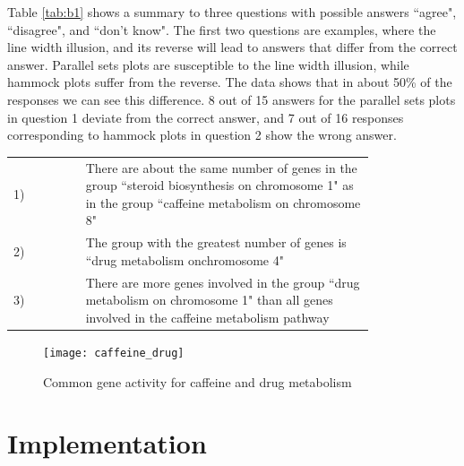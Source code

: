 Table \ref{tab:b1} shows a summary to three questions with possible answers ``agree", ``disagree", and ``don't know".
The first two questions are  examples, where the line width illusion, and its reverse will lead to answers that differ from the correct answer. Parallel sets plots are susceptible to the line width illusion, while hammock plots suffer from the reverse. The data shows that in about 50\% of the responses we can see this difference. 8 out of 15 answers for the parallel sets plots in question 1 deviate from the correct answer, and 7 out of 16 responses corresponding to hammock plots in question 2 show the wrong answer.


\begin{tabular}{lp{0.8\linewidth}}
 1) & There are about the same number of genes in the group ``steroid biosynthesis on chromosome 1" as in the group ``caffeine metabolism on chromosome 8"\\
 2) & The group with the greatest number of genes is ``drug metabolism onchromosome 4"\\
 3) & There are more genes involved in the group ``drug metabolism on chromosome 1" than all genes involved in the caffeine metabolism pathway
\end{tabular}


%

\begin{figure}[htbp] %
   \centering
   \texttt{[image: caffeine\_drug]} 
   \caption{Common gene activity for caffeine and drug metabolism}
   \label{fig:caffeine}
\end{figure}


\section{Implementation}


